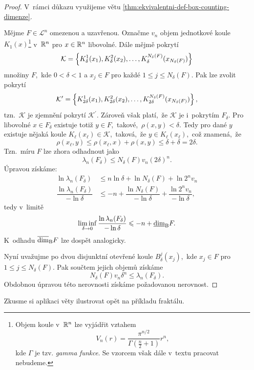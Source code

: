 \begin{proof}
    V~rámci důkazu využijeme větu \ref{thm:ekvivalentni-def-box-counting-dimenze}.

    Mějme $F\in\mathcal{L}^n$ omezenou a uzavřenou. Označme $v_n$ objem jednotkové koule $K_1(x)$\footnote{Objem koule v~$\mathbb{R}^n$ lze vyjádřit vztahem
    \[V_n(r)=\dfrac{\pi^{n/2}}{\Gamma\left(\frac{n}{2}+1\right)}r^n,\]
    kde $\Gamma$ je tzv. \emph{gamma funkce}. Se vzorcem však dále v~textu pracovat nebudeme.
    } v~$\mathbb{R}^n$ pro $x\in\mathbb{R}^n$ libovolné. Dále mějmě pokrytí
    \[\mathcal{K}=\left\{K_\delta^1(x_1),K_\delta^2(x_2),\ldots,K_\delta^{N_\delta(F)}(x_{N_\delta(F)})\right\}\]
    množiny $F$,~kde $0<\delta<1$ a $x_j\in F$ pro každé $1\leqslant j\leqslant N_\delta(F)$. Pak lze zvolit pokrytí
    \[\mathcal{K}^\prime=\left\{K_{2\delta}^1(x_1),K_{2\delta}^2(x_2),\ldots,K_{2\delta}^{N_\delta(F)}(x_{N_\delta(F)})\right\},\]
    tzn.~$\mathcal{K}$ je zjemnění pokrytí $\mathcal{K}^\prime$. Zároveň však platí,~že $\mathcal{K}$ je i~pokrytím $F_\delta$. Pro libovolné $x\in F_\delta$ existuje totiž $y\in F$,~takové,~$\rho(x,y)<\delta$. Tedy pro dané $y$ existuje nějaká koule $K_\ell(x_\ell)\in\mathcal{K}$,~taková,~že $y\in K_\ell(x_\ell)$,~což znamená,~že
    \[\rho(x_\ell,y)\leqslant\rho(x_\ell,x)+\rho(x,y)\leqslant\delta+\delta=2\delta.\]
    Tzn.~míru $F$ lze zhora odhadnout jako
    \[\lambda_n(F_\delta)\leqslant N_\delta(F)v_n(2\delta)^n.\]
    Úpravou získáme:
    \begin{align*}
        \ln{\lambda_n(F_\delta)}&\leqslant n\ln{\delta}+\ln{N_\delta(F)}+\ln{2^nv_n}\\
        \dfrac{\ln{\lambda_n(F_\delta)}}{-\ln\delta}&\leqslant -n+\dfrac{\ln{N_\delta(F)}}{-\ln\delta}+\dfrac{\ln{2^nv_n}}{-\ln\delta},
    \end{align*}
    tedy v~limitě
    \[\liminf_{\delta\to 0}\dfrac{\ln\lambda_n(F_\delta)}{-\ln\delta}\leqslant -n+\underline{\dim}_\textup{B}{F}.\]
    K~odhadu $\overline{\dim}_\textup{B}{F}$ lze dospět analogicky.

    Nyní uvažujme po dvou disjunktní otevřené koule $B_\delta^j(x_j)$,~kde $x_j\in F$ pro $1\leqslant j\leqslant N_\delta(F)$. Pak součtem jejich objemů získáme
    \[N_\delta(F)v_n\delta^n\leqslant\lambda_n(F_\delta).\]
    Obdobnou úpravou této nerovnosti získáme požadovanou nerovnost.
\end{proof}
Zkusme si aplikaci věty ilustrovat opět na příkladu fraktálu.
